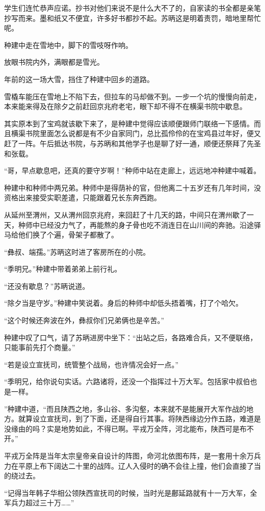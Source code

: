 学生们连忙恭声应诺。抄书对他们来说不是什么大不了的，自家读的书全都是亲笔抄写而来。墨和纸又不便宜，许多好书都抄不起。苏昞这是明着责罚，暗地里帮忙呢。

种建中走在雪地中，脚下的雪吱呀作响。

放眼书院内外，满眼都是雪光。

年前的这一场大雪，挡住了种建中回乡的道路。

雪橇车能压在雪地上不陷下去，但拉车的马却做不到。一步一个坑的慢慢向前走，本来能来得及在除夕之前赶回京兆府老宅，眼下却不得不在横渠书院中歇息。

其实原本到了宝鸡就该歇下来了，是种建中觉得应该顺便跟师门联络一下感情。而且横渠书院里面怎么说都是有不少自家同门，总比孤伶伶的在宝鸡县过年好，便又赶了一阵。午后抵达书院，与苏昞和其他学子也是聊了好一通，顺便还祭拜了先圣和张载。

“哥，早点歇息吧，还真的要守岁啊！”种师中站在走廊上，远远地冲种建中喊着。

种建中和种师中两兄弟。种师中是得荫补的官，但他离二十五岁还有几年时间，没资格出来接受实职差遣，只能跟着兄长东奔西跑。

从延州至渭州，又从渭州回京兆府，来回赶了十几天的路，中间只在渭州歇了一天，种师中已经没力气了，再能熬的身子骨也吃不消连日在山川间的奔驰。沿途驿马给他们换了个遍，骨架子都散了。

“彝叔、端孺。”苏昞这时进了客房所在的小院。

“季明兄。”种建中带着弟弟上前行礼。

“还没有歇息？”苏昞说道。

“除夕当是守岁。”种建中笑说着。身后的种师中却低头捂着嘴，打了个哈欠。

“这个时候还奔波在外，彝叔你们兄弟俩也是辛苦。”

种建中叹了口气，请了苏昞进房中坐下：“出站之后，各路难合兵，又不便联络，只能事前先打个商量。”

“若是设立宣抚司，统管整个战局，也许情况会好一点。”

“季明兄，给你说句实话。六路诸将，还没一个指挥过十万大军。包括家中叔伯也是一样。

”种建中道，“而且陕西之地，多山谷、多沟壑，本来就不是能展开大军作战的地方。就算设立宣抚司，到了下面，还是得自行其事。将陕西缘边分作五路，难道是没缘由的吗？实是地势如此，不得已啊。平戎万全阵，河北能布，陕西可是布不开。”

平戎万全阵是当年太宗皇帝亲自设计的阵图，命河北依图布阵，是一套用十余万兵力在平原上布下阔达二十里的战阵。辽人入侵时的确不会往上撞，他们会直接了当的绕过去。

“记得当年韩子华相公领陕西宣抚司的时候，当时光是鄜延路就有十一万大军，全军兵力超过三十万……”

